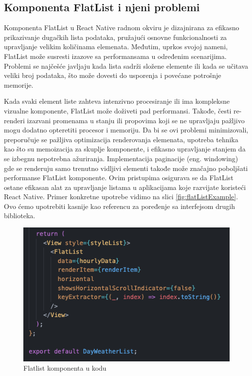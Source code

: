 \documentclass[12pt,oneside]{memoir}
\begin{document}
\subsection{Komponenta FlatList i njeni problemi}

Komponenta FlatList\cite{flatList} u React Native radnom okviru je dizajnirana za efikasno prikazivanje dugačkih lista podataka, pružajući osnovne funkcionalnosti za upravljanje velikim količinama elemenata. Međutim, uprkos svojoj nameni, FlatList može susresti izazove sa performansama u određenim scenarijima. Problemi se najčešće javljaju kada lista sadrži složene elemente ili kada se učitava veliki broj podataka, što može dovesti do usporenja i povećane potrošnje memorije.

Kada svaki element liste zahteva intenzivno procesiranje ili ima kompleksne vizualne komponente, FlatList može doživeti pad performansi. Takođe, česti re-renderi izazvani promenama u stanju ili propovima koji se ne upravljaju pažljivo mogu dodatno opteretiti procesor i memoriju. Da bi se ovi problemi minimizovali, preporučuje se pažljiva optimizacija renderovanja elemenata, upotreba tehnika kao što su memoizacija za skuplje komponente, i efikasno upravljanje stanjem da se izbegnu nepotrebna ažuriranja. Implementacija paginacije (eng. windowing) gde se renderuju samo trenutno vidljivi elementi takođe može značajno poboljšati performanse FlatList komponente. Ovim pristupima osigurava se da FlatList ostane efikasan alat za upravljanje listama u aplikacijama koje razvijate koristeći React Native. Primer konkretne upotrebe vidimo na slici \ref{fig:flatListExample}. Ovo ćemo upotrebiti kasnije kao referencu za poređenje sa interfejsom drugih biblioteka.

\begin{figure}[h!]
    \centering
    \includegraphics[scale=0.5]{docs/images/chapterFive/flatlistExample.png}
    \caption{Flatlist komponenta u kodu}
    \label{fig:flatListExample1}
\end{figure}
\end{document}
